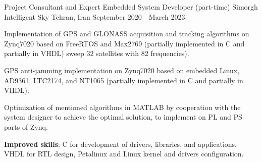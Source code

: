 \begin{cventries}
  \cventry
    {Project Consultant and Expert Embedded System Developer (part-time)} %
    {Simorgh Intelligent Sky} %
    {Tehran, Iran} %
    {September 2020~\textendash~March 2023} %
    {
      \begin{cvitems} %
        \item {Implementation of GPS and GLONASS acquisition and tracking algorithms on Zynq7020 based on FreeRTOS and Max2769 (partially implemented in C and partially in VHDL) 
 sweep 32 satellites with 82 frequencies).}
        \item {GPS anti-jamming implementation on Zynq7020 based on embedded Linux, AD9361, LTC2174, and NT1065 (partially implemented in C and partially in VHDL).}
	\item {Optimization of mentioned algorithms in MATLAB by cooperation with the system designer to achieve the optimal solution, to implement on PL and PS parts of Zynq.}
        \item {\textbf{Improved skills}: C for development of drivers, libraries, and applications. VHDL for RTL design, Petalinux and Linux kernel and drivers configuration.}
      \end{cvitems}
    }


\end{cventries}
